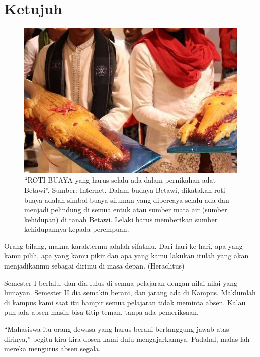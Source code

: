 
\chapter{Ketujuh}

\begin{figure}[htbp]
\centerline{\includegraphics[scale=1.0]{01-07-01}}
\caption{“ROTI BUAYA yang harus selalu ada dalam pernikahan adat Betawi”. Sumber: Internet. Dalam budaya Betawi, dikatakan roti buaya adalah simbol buaya siluman yang dipercaya selalu ada dan menjadi pelindung di semua entuk atau sumber mata air (sumber kehidupan) di tanah Betawi. Lelaki harus memberikan sumber kehidupannya kepada perempuan.}
\label{01-07-01}
\end{figure}
%

Orang bilang, makna karaktermu adalah sifatmu. Dari hari ke hari, apa yang kamu pilih, apa yang kamu pikir dan apa yang kamu lakukan itulah yang akan menjadikanmu sebagai dirimu di masa depan. (Heraclitus)

Semester I berlalu, dan dia lulus di semua pelajaran dengan nilai-nilai yang lumayan. Semester II dia semakin berani, dan jarang ada di Kampus. Maklumlah di kampus kami saat itu hampir semua pelajaran tidak meminta absen. Kalau pun ada absen masih bisa titip teman, tanpa ada pemeriksaan.

“Mahasiswa itu orang dewasa yang harus berani bertanggung-jawab atas dirinya,” begitu kira-kira dosen kami dulu mengajarkannya. Padahal, malas lah mereka mengurus absen segala.

